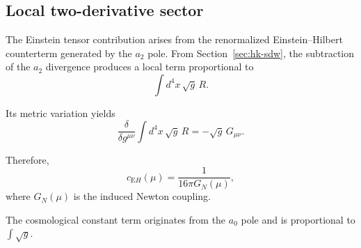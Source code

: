 \subsection{Local two-derivative sector}
  \label{subsec:two-derivative}

  The Einstein tensor contribution arises from the renormalized
  Einstein--Hilbert counterterm generated by the $a_2$ pole.
  From Section~\ref{sec:hk-sdw}, the subtraction of the $a_2$ divergence
  produces a local term proportional to
  \begin{equation}
    \int d^4x\,\sqrt{g}\, R .
  \end{equation}

  Its metric variation yields
  \begin{equation}
    \frac{\delta}{\delta g^{\mu\nu}}
    \int d^4x\,\sqrt{g}\, R
    =
    -\sqrt{g}\, G_{\mu\nu}.
  \end{equation}

  Therefore,
  \begin{equation}
    c_{\mathrm EH}(\mu)
    =
    \frac{1}{16\pi G_N(\mu)},
  \end{equation}
  where $G_N(\mu)$ is the induced Newton coupling.

  The cosmological constant term originates from the $a_0$ pole and
  is proportional to $\int\sqrt{g}$.
